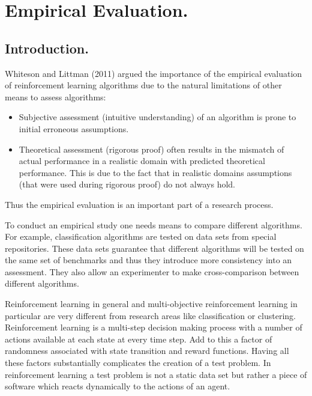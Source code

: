 \chapter{Empirical Evaluation.}

\section{Introduction.}

Whiteson and Littman (2011)\nocite{whiteson2011introduction} argued the importance of the empirical evaluation of reinforcement learning algorithms due to the natural limitations of other means to assess algorithms:

\begin{itemize}
  \item Subjective assessment (intuitive understanding) of an algorithm is prone to initial erroneous assumptions.
  \item Theoretical assessment (rigorous proof) often results in the mismatch of actual performance in a realistic domain with predicted theoretical performance. This is due to the fact that in realistic domains assumptions (that were used during rigorous proof) do not always hold.
\end{itemize}
Thus the empirical evaluation is an important part of a research process.

To conduct an empirical study one needs means to compare different algorithms. For example, classification algorithms are tested on data sets from special repositories. These data sets guarantee that different algorithms will be tested on the same set of benchmarks and thus they introduce more consistency into an assessment. They also allow an experimenter to make cross-comparison between different algorithms.

Reinforcement learning in general and multi-objective reinforcement learning in particular are very different from research areas like classification or clustering. Reinforcement learning is a multi-step decision making process with a number of actions available at each state at every time step. Add to this a factor of randomness associated with state transition and reward functions. Having all these factors substantially complicates the creation of a test problem. In reinforcement learning a test problem is not a static data set but rather a piece of software which reacts dynamically to the actions of an agent.

